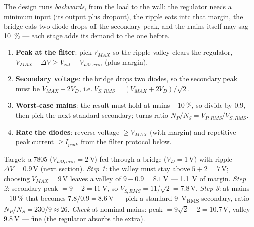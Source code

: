 \documentclass[11pt,a4paper,oneside]{book}
\begin{document}
The design runs \emph{backwards}, from the load to the wall: the regulator needs
a minimum input (its output plus dropout), the ripple eats into that margin, the
bridge eats two diode drops off the secondary peak, and the mains itself may sag
\qty{10}{\percent} --- each stage adds its demand to the one before.

\begin{protocol}
\begin{enumerate}[leftmargin=1.5cm]
  \item \textbf{Peak at the filter}: pick $V_{MAX}$ so the ripple valley clears
        the regulator, $V_{MAX}-\Delta V\ge V_{out}+V_{DO,min}$ (plus margin).
  \item \textbf{Secondary voltage}: the bridge drops two diodes, so the
        secondary peak must be $V_{MAX}+2V_D$, i.e.
        $V_{S,RMS}=(V_{MAX}+2V_D)/\sqrt2$.
  \item \textbf{Worst-case mains}: the result must hold at mains
        $-\qty{10}{\percent}$, so divide by $0.9$, then pick the next standard
        secondary; turns ratio $N_P/N_S=V_{P,RMS}/V_{S,RMS}$.
  \item \textbf{Rate the diodes}: reverse voltage $\ge V_{MAX}$ (with margin)
        and repetitive peak current $\ge I_{peak}$ from the filter protocol
        below.
\end{enumerate}
\end{protocol}

\begin{wexample}
Target: a 7805 ($V_{DO,min}=\qty{2}{\volt}$) fed through a bridge
($V_D=\qty{1}{\volt}$) with ripple $\Delta V=\qty{0.9}{\volt}$ (next section).
\emph{Step 1}: the valley must stay above $5+2=\qty{7}{\volt}$; choosing
$V_{MAX}=\qty{9}{\volt}$ leaves a valley of $9-0.9=\qty{8.1}{\volt}$ ---
\qty{1.1}{\volt} of margin. \emph{Step 2}: secondary peak $=9+2=\qty{11}{\volt}$,
so $V_{S,RMS}=11/\sqrt2=\qty{7.8}{\volt}$. \emph{Step 3}: at mains
$-\qty{10}{\percent}$ that becomes $7.8/0.9=\qty{8.6}{\volt}$ --- pick a standard
\qty{9}{\volt_{RMS}} secondary, ratio $N_P/N_S=230/9\approx26$.
\emph{Check} at nominal mains: peak $=9\sqrt2-2=\qty{10.7}{\volt}$, valley
$\qty{9.8}{\volt}$ --- fine (the regulator absorbs the extra).
\end{wexample}
\end{document}
